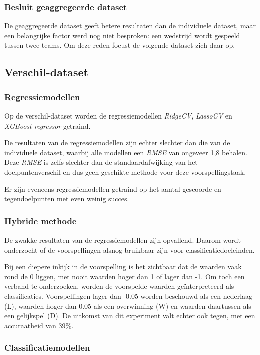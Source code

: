 \subsubsection{Besluit geaggregeerde dataset}

De geaggregeerde dataset geeft betere resultaten dan de individuele dataset, maar een belangrijke factor werd nog niet besproken: een wedstrijd wordt gespeeld tussen twee teams.
Om deze reden focust de volgende dataset zich daar op. 

\subsection{Verschil-dataset}
\subsubsection{Regressiemodellen}

Op de verschil-dataset worden de regressiemodellen \emph{RidgeCV}, \emph{LassoCV} en \emph{XGBoost-regressor} getraind.

De resultaten van de regressiemodellen zijn echter slechter dan die van de individuele dataset, waarbij alle modellen een \emph{RMSE} van ongeveer 1,8 behalen. Deze \emph{RMSE} is zelfs slechter dan de standaardafwijking van het doelpuntenverschil en dus geen geschikte methode voor deze voorspellingstaak.

Er zijn eveneens regressiemodellen getraind op het aantal gescoorde en tegendoelpunten met even weinig succes.

\subsubsection{Hybride methode}

De zwakke resultaten van de regressiemodellen zijn opvallend. Daarom wordt onderzocht of de voorspellingen alsnog bruikbaar zijn voor classificatiedoeleinden.

Bij een diepere inkijk in de voorspelling is het zichtbaar dat de waarden vaak rond de 0 liggen, met nooit waarden hoger dan 1 of lager dan -1. Om toch een verband te onderzoeken, worden de voorspelde waarden geïnterpreteerd als classificaties. Voorspellingen lager dan -0.05 worden beschouwd als een nederlaag (L), waarden hoger dan 0.05 als een overwinning (W) en waarden daartussen als een gelijkspel (D). De uitkomst van dit experiment valt echter ook tegen, met een accuraatheid van 39\%.

\subsubsection{Classificatiemodellen}

